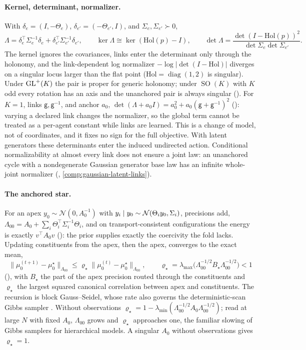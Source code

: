 \paragraph{Kernel, determinant, normalizer.} With \(\delta_e=(I,-\Theta_e)\), \(\delta_{e'}=(-\Theta_{e'},I)\), and
\(\Sigma_e,\Sigma_{e'}\succ0\),
\[
\Lambda=\delta_e^\top\Sigma_e^{-1}\delta_e+\delta_{e'}^\top\Sigma_{e'}^{-1}\delta_{e'},\qquad
\ker\Lambda\cong\ker(\mathrm{Hol}(p)-I),\qquad
\det\Lambda=\frac{\det(I-\mathrm{Hol}(p))^2}{\det\Sigma_e\det\Sigma_{e'}}.
\]
The kernel ignores the covariances, links enter the determinant only through the holonomy, and the link-dependent
log normalizer \(-\log\lvert\det(I-\mathrm{Hol})\rvert\) diverges on a singular locus larger than the flat point
(\(\mathrm{Hol}=\operatorname{diag}(1,2)\) is singular). Under \(\mathrm{GL}^+(K)\) the pair is proper for generic holonomy; under
\(\operatorname{SO}(K)\) with \(K\) odd every rotation has an axis and the unanchored pair is always singular
(). For \(K=1\), links \(\mathsf g,\mathsf g^{-1}\), and anchor \(a_0\),
\(\det(\Lambda+a_0I)=a_0^2+a_0(\mathsf g+\mathsf g^{-1})^2\) (): varying a declared
link changes the normalizer, so the global term cannot be treated as a per-agent constant while links are learned.
This is a change of model, not of coordinates, and it fixes no sign for the full objective. With
latent generators these determinants enter the induced undirected action. Conditional
normalizability at almost every link does not ensure a joint law: an unanchored cycle with a
nondegenerate Gaussian generator base law has an infinite whole-joint normalizer
(, \cref{comp:gaussian-latent-links}).

\paragraph{The anchored star.} For an apex \(y_0\sim\mathcal N(0,A_0^{-1})\) with
\(y_i\mid y_0\sim\mathcal N(\Theta_iy_0,\Sigma_i)\), precisions add, \(\Lambda_{00}=A_0+\sum_i\Theta_i^\top\Sigma_i^{-1}\Theta_i\),
and on transport-consistent configurations the energy is exactly \(v^\top A_0v\) (): the
prior supplies exactly the coercivity the fold lacks. Updating constituents from the apex, then the apex, converges to
the exact mean,
\[
\lVert\mu_0^{(t+1)}-\mu_0^\star\rVert_{\Lambda_{00}}\leq\varrho_\star\lVert\mu_0^{(t)}-\mu_0^\star\rVert_{\Lambda_{00}},
\qquad
\varrho_\star=\lambda_{\max}\bigl(\Lambda_{00}^{-1/2}B_\star\Lambda_{00}^{-1/2}\bigr)<1
\]
(), with \(B_\star\) the part of the apex precision routed through the
constituents and \(\varrho_\star\) the largest squared canonical correlation between apex and constituents. The recursion
is block Gauss--Seidel, whose rate also governs the deterministic-scan Gibbs sampler \citep{RobertsSahu1997}. Without
observations \(\varrho_\star=1-\lambda_{\min}(\Lambda_{00}^{-1/2}A_0\Lambda_{00}^{-1/2})\); read at large \(N\) with fixed
\(A_0\), \(\Lambda_{00}\) grows and \(\varrho_\star\) approaches one, the familiar slowing of Gibbs samplers for hierarchical
models. A singular \(A_0\) without observations gives \(\varrho_\star=1\).

